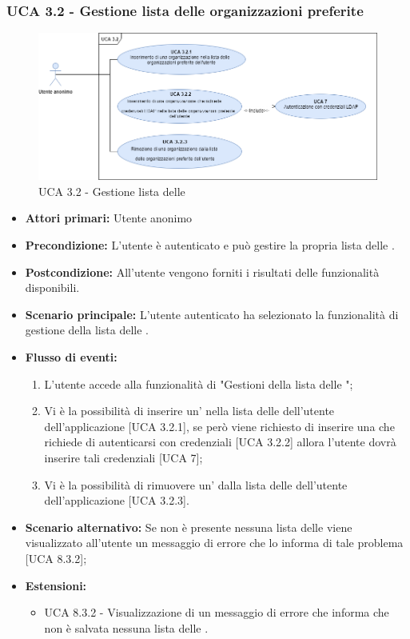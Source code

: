 \subsubsection{UCA 3.2 - Gestione lista delle organizzazioni preferite}%
\begin{figure}[h]
	\centering
	\includegraphics[scale=0.45 , center]{Sezioni/UseCase/Immagini/UCA3.2.png}
	\caption{UCA 3.2 - Gestione lista delle }
\end{figure}
\begin{itemize}
	\item \textbf{Attori primari:} Utente anonimo
	\item \textbf{Precondizione:} L'utente è autenticato e può gestire la propria lista delle .
	\item \textbf{Postcondizione:} All'utente vengono forniti i risultati delle funzionalità disponibili.
	\item \textbf{Scenario principale:} L'utente autenticato ha selezionato la funzionalità di gestione della lista delle .
	\item \textbf{Flusso di eventi:}
			\begin{enumerate}
			\item L'utente accede alla funzionalità di "Gestioni della lista delle ";
			\item Vi è la possibilità di inserire un' nella lista delle  dell'utente dell'applicazione [UCA 3.2.1], se però viene richiesto di inserire una  che richiede di autenticarsi con credenziali  [UCA 3.2.2] allora l'utente dovrà inserire tali credenziali [UCA 7];
			\item Vi è la possibilità di rimuovere un' dalla lista delle  dell'utente dell'applicazione [UCA 3.2.3].
			\end{enumerate}
	\item \textbf{Scenario alternativo:} Se non è presente nessuna lista delle  viene visualizzato all'utente un messaggio di errore che lo informa di tale problema [UCA 8.3.2];
	\item \textbf{Estensioni:}
	\begin{itemize}
		\item UCA 8.3.2 - Visualizzazione di un messaggio di errore che informa che non è salvata nessuna lista delle .
	\end{itemize}
\end{itemize}

